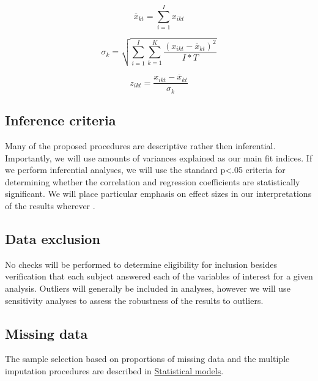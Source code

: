 \documentclass[]{article}
\begin{document}
\begin{equation} \label{eq:Mean}
  \overline{x}_{kt} =  \sum_{i=1}^I x_{ikt}
\end{equation}

\begin{equation} \label{eq:NormalizationSd}
  \sigma_{k} =  \sqrt{\sum_{i=1}^I \sum_{k=1}^K \frac{(x_{ikt}-\overline{x}_{kt})^2}{I*T}}
\end{equation}

\begin{equation} \label{eq:NormalizedScore}
  z_{ikt} =  \frac{x_{ikt}-\overline{x}_{kt}}{\sigma_{k}}
\end{equation}

\hypertarget{inference-criteria}{%
\subsection{Inference criteria}\label{inference-criteria}}

Many of the proposed procedures are descriptive rather then inferential.
Importantly, we will use amounts of variances explained as our main fit
indices. If we perform inferential analyses, we will use the standard
p\textless.05 criteria for determining whether the correlation and
regression coefficients are statistically significant.
We will place particular emphasis on effect sizes
in our interpretations of the results
wherever .

\hypertarget{data-exclusion}{%
\subsection{Data exclusion}\label{data-exclusion}}

No checks will be performed to determine eligibility for inclusion
besides verification that each subject answered each of the variables of
interest for a given analysis. Outliers will generally be included in
analyses, however we will use sensitivity analyses to assess the
robustness of the results to outliers.

\hypertarget{missing-data}{%
\subsection{Missing data}\label{missing-data}}

The sample selection based on proportions of missing data and the
multiple imputation procedures are described in
\protect\hyperlink{statistical-models}{Statistical models}.
\end{document}
